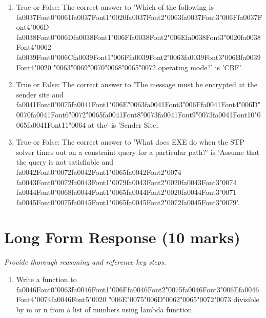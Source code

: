 \documentclass[12pt]{article}
\begin{document}
\begin{enumerate}[label=\arabic*.]
\item True or False: The correct answer to 'Which of the following is {\csname fa0037Font0\endcsname\char"0061}{\csname fa0037Font1\endcsname\char"0020}{\csname fa0037Font2\endcsname\char"0063}{\csname fa0037Font3\endcsname\char"006F}{\csname fa0037Font4\endcsname\char"006D} {\csname fa0038Font0\endcsname\char"006D}{\csname fa0038Font1\endcsname\char"006F}{\csname fa0038Font2\endcsname\char"006E}{\csname fa0038Font3\endcsname\char"0020}{\csname fa0038Font4\endcsname\char"0062} {\csname fa0039Font0\endcsname\char"006C}{\csname fa0039Font1\endcsname\char"006F}{\csname fa0039Font2\endcsname\char"0063}{\csname fa0039Font3\endcsname\char"006B}{\csname fa0039Font4\endcsname\char"0020} {\char"0063}{\char"0069}{\char"0070}{\char"0068}{\char"0065}{\char"0072} operating mode?' is 'CBF'.
\item True or False: The correct answer to 'The message must be encrypted at the sender site and {\csname fa0041Font0\endcsname\char"0075}{\csname fa0041Font1\endcsname\char"006E}{\char"0063}{\csname fa0041Font3\endcsname\char"006F}{\csname fa0041Font4\endcsname\char"006D}{\char"0070}{\csname fa0041Font6\endcsname\char"0072}{\char"0065}{\csname fa0041Font8\endcsname\char"0073}{\csname fa0041Font9\endcsname\char"0073}{\csname fa0041Font10\endcsname\char"0065}{\csname fa0041Font11\endcsname\char"0064} at the' is 'Sender Site'.
\item True or False: The correct answer to 'What does EXE do when the STP solver times out on a constraint query for a particular path?' is 'Assume that the query is not satisfiable and {\csname fa0042Font0\endcsname\char"0072}{\csname fa0042Font1\endcsname\char"0065}{\csname fa0042Font2\endcsname\char"0074} {\csname fa0043Font0\endcsname\char"0072}{\csname fa0043Font1\endcsname\char"0079}{\csname fa0043Font2\endcsname\char"0020}{\csname fa0043Font3\endcsname\char"0074} {\csname fa0044Font0\endcsname\char"0068}{\csname fa0044Font1\endcsname\char"0065}{\csname fa0044Font2\endcsname\char"0020}{\csname fa0044Font3\endcsname\char"0071} {\csname fa0045Font0\endcsname\char"0075}{\csname fa0045Font1\endcsname\char"0065}{\csname fa0045Font2\endcsname\char"0072}{\csname fa0045Font3\endcsname\char"0079}'.
\end{enumerate}

\section*{Long Form Response (10 marks)}
\textit{Provide thorough reasoning and reference key steps.}
\begin{enumerate}[label=\arabic*.]
\item Write a function to {\csname fa0046Font0\endcsname\char"0063}{\csname fa0046Font1\endcsname\char"006F}{\csname fa0046Font2\endcsname\char"0075}{\csname fa0046Font3\endcsname\char"006E}{\csname fa0046Font4\endcsname\char"0074}{\csname fa0046Font5\endcsname\char"0020} {\char"006E}{\char"0075}{\char"006D}{\char"0062}{\char"0065}{\char"0072}{\char"0073} divisible by m or n from a list of numbers using lambda
function.
\end{enumerate}
\end{document}
